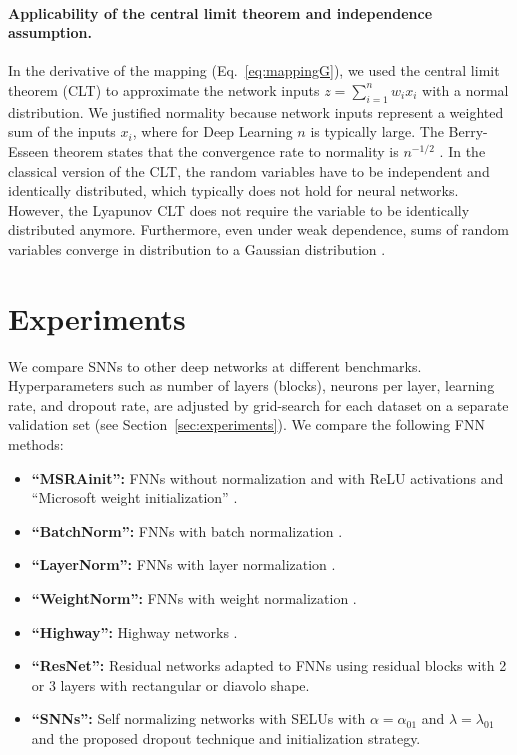 \documentclass{article}
\begin{document}
\paragraph{Applicability of the central limit theorem and independence assumption.}
\label{sec:clt} 
In the derivative of the mapping (Eq.~\eqref{eq:mappingG}), we used the central limit theorem (CLT) 
to approximate the network inputs $z=\sum_{i=1}^n w_i x_i$ with a normal distribution.
We justified normality because network inputs represent a weighted sum of the inputs $x_i$, where for Deep Learning $n$ is typically large.
The Berry-Esseen theorem states that the convergence rate to normality is $n^{-1/2}$ \citep{bib:Korolev2012}. 
In the classical version of the CLT, the random variables have to be independent and identically 
distributed, which typically does not hold for neural networks.
However, the Lyapunov CLT does not require the variable to be identically distributed anymore. Furthermore,
even under weak dependence, sums of random variables converge in distribution to a Gaussian distribution \cite{bib:Bradley1981}.



\section*{Experiments}
We compare SNNs to other deep networks at different
benchmarks. 
Hyperparameters such as
number of layers (blocks), neurons per layer, learning rate, and dropout rate,
are adjusted by grid-search for each dataset on a separate validation set
(see Section~\ref{sec:experiments}). 
We compare the following FNN methods: 
\begin{itemize}
\item {\bf ``MSRAinit'':} FNNs without normalization and 
with ReLU activations and ``Microsoft weight initialization'' \citep{bib:He2015init}.
\item {\bf ``BatchNorm'':} FNNs with batch normalization \citep{bib:Ioffe2015}. 
\item {\bf ``LayerNorm'':} FNNs with layer normalization \citep{bib:Ba2016}. 
\item {\bf ``WeightNorm'':} FNNs with weight normalization \citep{bib:Salimans2016}. 
\item {\bf ``Highway'':} Highway networks \citep{bib:Srivastava2015}.
\item {\bf ``ResNet'':} Residual networks \citep{bib:He2015res} adapted to FNNs  
using residual blocks with 2 or 3 layers with rectangular or diavolo shape. 
\item {\bf ``SNNs'':} Self normalizing networks with SELUs with $\alpha=\alpha_{\mathrm{01}}$ and $\lambda=\lambda_{\mathrm{01}}$ and 
the proposed dropout technique and initialization strategy. 
\end{itemize}
\end{document}
